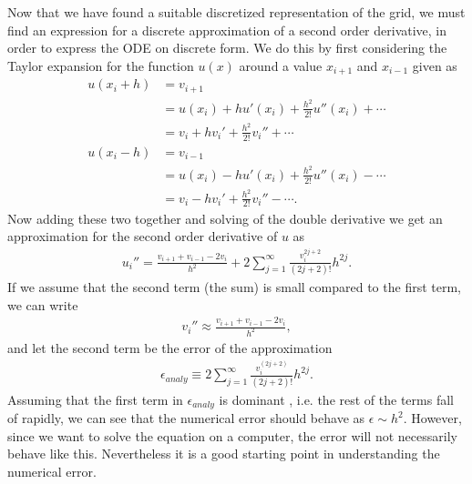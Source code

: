 \documentclass[twocolumn]{aastex62}
\begin{document}
Now that we have found a suitable discretized representation of the grid, we must find an expression for a discrete approximation of a second order derivative, in order to express the ODE on discrete form. We do this by first considering the Taylor expansion for the function $u(x)$ around a value $x_{i+1} $ and $x_{i-1}$ given as
\begin{align*}
	u(x_i + h) &= v_{i+1} \\
	&= u(x_i) + hu'(x_i) + \frac{h^2}{2!}u''(x_i) +\cdots\\
	&= v_i + hv_i' + \frac{h^2}{2!}v_i'' + \cdots\\
	u(x_i - h) &= v_{i-1} \\
	& = u(x_i) - hu'(x_i) + \frac{h^2}{2!}u''(x_i) -\cdots\\
	&= v_i - hv_i' + \frac{h^2}{2!}v_i'' - \cdots.
\end{align*} 
Now adding these two together and solving of the double derivative we get an approximation for the second order derivative of $u$ as 
\begin{align}
	u_i'' = \frac{v_{i+1} + v_{i-1} - 2v_i}{h^2} + 2\sum^\infty_{j=1} \frac{v_i^{2j+2}}{(2j + 2)!}h^{2j}.
\end{align}
If we assume that the second term (the sum) is small compared to the first term, we can write 
\begin{align}
	v_i''\approx \frac{v_{i+1} + v_{i-1} - 2v_i}{h^2},
\end{align}
and let the second term be the error of the approximation
\begin{align}
	\epsilon_{analy} \equiv 2\sum^\infty_{j=1} \frac{v_i^{(2j+2)}}{(2j + 2)!}h^{2j}.
	\label{eq:analy_error}
\end{align} Assuming that the first term in $\epsilon_{analy}$ is dominant , i.e. the rest of the terms fall of rapidly, we can see that the numerical error should behave as $\epsilon\sim h^2$. However, since we want to solve the equation on a computer, the error will not necessarily behave like this. Nevertheless it is a good starting point in understanding the numerical error. 
\end{document}
